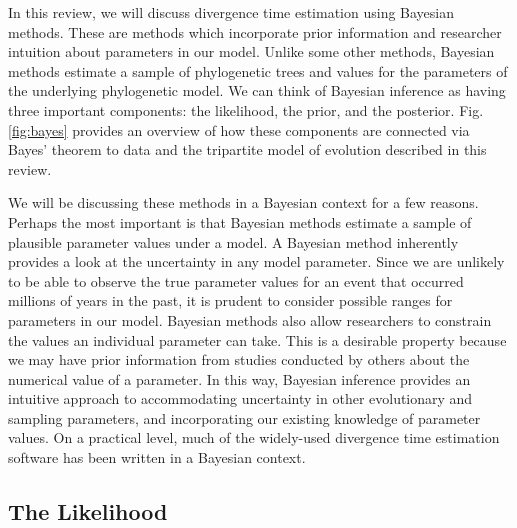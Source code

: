 \documentclass[11pt]{article}
\newcommand{\rw}[1]{{\textcolor{red}{[RW: #1]}}} %
\newcommand{\aw}[1]{{\textcolor{armygreen}{[AW: #1]}}} %
\begin{document}
In this review, we will discuss divergence time estimation using Bayesian methods. 
These are methods which incorporate prior information and researcher intuition about parameters in our model.
Unlike some other methods, Bayesian methods estimate a sample of phylogenetic trees and values for the parameters of the underlying phylogenetic model.
We can think of Bayesian inference as having three important components: the likelihood, the prior, and the posterior.
Fig. \ref{fig:bayes} provides an overview of how these components are connected via Bayes' theorem to data and the tripartite model of evolution described in this review.

We will be discussing these methods in a Bayesian context for a few reasons.
Perhaps the most important is that Bayesian methods estimate a sample of plausible parameter values under a model. 
A Bayesian method inherently provides a look at the uncertainty in any model parameter.
Since we are unlikely to be able to observe the true parameter values for an event that occurred millions of years in the past, it is prudent to consider possible ranges for parameters in our model.
Bayesian methods also allow researchers to constrain the values an individual parameter can take. 
This is a desirable property because we may have prior information from studies conducted by others about the numerical value of a parameter.
In this way, Bayesian inference provides an intuitive approach to accommodating uncertainty in other evolutionary and sampling parameters, and incorporating our existing knowledge of parameter values.
On a practical level, much of the widely-used divergence time estimation software has been written in a Bayesian context.


\subsection{The Likelihood}
\end{document}
